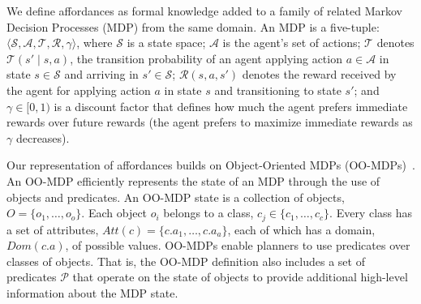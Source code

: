 \documentclass[letterpaper]{article}
\begin{document}
We define affordances as formal knowledge added to a family of related
Markov Decision Processes (MDP) from the same domain.  An MDP is a
five-tuple: $\langle \mathcal{S}, \mathcal{A}, \mathcal{T},
\mathcal{R}, \gamma \rangle$, where $\mathcal{S}$ is a state space;
$\mathcal{A}$ is the agent's set of actions; $\mathcal{T}$ denotes
$\mathcal{T}(s' \mid s,a)$, the transition probability of an agent
applying action $a \in \mathcal{A}$ in state $s \in \mathcal{S}$ and
arriving in $s' \in \mathcal{S}$; $\mathcal{R}(s,a,s')$ denotes the
reward received by the agent for applying action $a$ in state $s$ and
transitioning to state $s'$; and $\gamma \in [0, 1)$ is a discount
  factor that defines how much the agent prefers immediate rewards
  over future rewards (the agent prefers to maximize immediate rewards
  as $\gamma$ decreases). 

Our representation of affordances builds on Object-Oriented MDPs
(OO-MDPs)~\citep{diuk08}.  An OO-MDP efficiently represents the state
of an MDP through the use of objects and predicates.  An OO-MDP state
is a collection of objects, $O = \{o_1, \ldots, o_o \}$.  Each object
$o_i$ belongs to a class, $c_j \in \{c_1, \ldots, c_c\}$. Every class
has a set of attributes, $Att(c) = \{c.a_1, \ldots, c.a_a \}$, each of
which has a domain, $Dom(c.a)$, of possible values. OO-MDPs enable
planners to use predicates over classes of objects. That is, the
OO-MDP definition also includes a set of predicates $\mathcal{P}$ that
operate on the state of objects to provide additional high-level
information about the MDP state.
\end{document}
